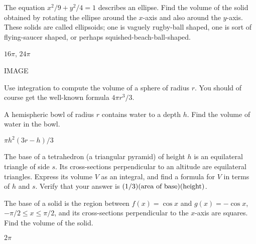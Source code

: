 \begin{exercises}
\begin{exercise} The equation $x^2/9+y^2/4=1$ describes an ellipse.  Find the
volume of the solid obtained by rotating the ellipse around the
$x$-axis and also around the $y$-axis. These solids are
called {\dfont ellipsoids\/}; one is vaguely rugby-ball shaped, one is
sort of flying-saucer shaped, or perhaps squished-beach-ball-shaped.
\begin{answer} $16\pi$, $24\pi$
\end{answer}\end{exercise}


IMAGE

\begin{exercise} Use integration to compute the volume of a sphere of radius
$r$. You should of course get the well-known formula $4\pi r^3/3$.
\end{exercise}

\begin{exercise}
A hemispheric bowl of radius $r$ contains water to a depth $h$.  Find
the volume of water in the bowl.
\begin{answer} $\pi h^2(3r-h)/3$
\end{answer}\end{exercise}

\begin{exercise} The base of a tetrahedron (a triangular pyramid) of height $h$
is an equilateral triangle of side $s$.  Its cross-sections
perpendicular to an altitude are equilateral triangles.  Express its
volume $V$ as an integral, and find a formula for $V$ in terms of $h$
and $s$. Verify that your answer is $(1/3)(\hbox{area of
  base})(\hbox{height})$. 
\end{exercise}

\begin{exercise}
The base of a solid is the region between $f(x)=\cos x$ and
$g(x)=-\cos x$, $-\pi/2\le x\le\pi/2$,
and its cross-sections perpendicular to the $x$-axis 
are squares.
Find the volume of the solid.
\begin{answer} $2\pi$
\end{answer}\end{exercise}

\end{exercises}







